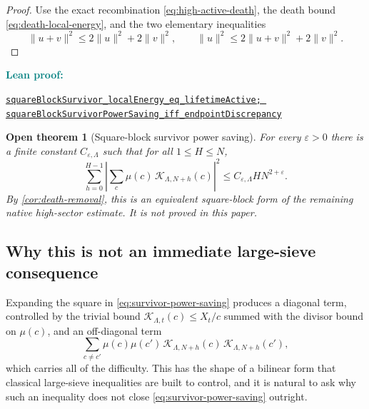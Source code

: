 \documentclass[11pt]{article}
\newtheorem{conjecture}[theorem]{Open theorem}
\theoremstyle{definition}
\newcommand{\eps}{\varepsilon}
\newcommand{\1}{\mathbf{1}}
\newcommand{\leanxref}[3]{%
  \par\smallskip
  {\small\noindent\textcolor{teal}{\textbf{#1:}}\par
  \noindent\href{#3}{\nolinkurl{#2}}\par}
  \smallskip
}
\begin{document}
\begin{proof}
Use the exact recombination \cref{eq:high-active-death}, the death bound \cref{eq:death-local-energy}, and the two elementary inequalities
\[
 \|u+v\|^2\le2\|u\|^2+2\|v\|^2,
 \qquad
 \|u\|^2\le2\|u+v\|^2+2\|v\|^2.
\]
\end{proof}
\leanxref{Lean proof}{squareBlockSurvivor_localEnergy_eq_lifetimeActive; squareBlockSurvivorPowerSaving_iff_endpointDiscrepancy}{https://github.com/OVVO-Financial/square-block-mobius/blob/main/lean/RHLean/Analysis/SquareBlockSurvivorBridge.lean}

\begin{conjecture}[Square-block survivor power saving]
\label{conj:survivor-power-saving}
For every $\eps>0$ there is a finite constant $C_{\eps,\Lambda}$ such that for all $1\le H\le N$,
\begin{equation}
 \boxed{
 \sum_{h=0}^{H-1}
 \left|
 \sum_{c}\mu(c)\,\mathcal K_{\Lambda,N+h}(c)
 \right|^2
 \le C_{\eps,\Lambda}H N^{2+\eps}.
 }
 \label{eq:survivor-power-saving}
\end{equation}
By \cref{cor:death-removal}, this is an equivalent square-block form of the remaining native high-sector estimate.  It is not proved in this paper.
\end{conjecture}

\subsection{Why this is not an immediate large-sieve consequence}
\label{subsec:why-not-large-sieve}

Expanding the square in \cref{eq:survivor-power-saving} produces a diagonal term, controlled by the trivial bound $\mathcal K_{\Lambda,t}(c)\le X_t/c$ summed with the divisor bound on $\mu(c)$, and an off-diagonal term
\begin{equation}
 \sum_{c\ne c'}\mu(c)\mu(c')\,\mathcal K_{\Lambda,N+h}(c)\,\mathcal K_{\Lambda,N+h}(c'),
 \label{eq:survivor-off-diagonal}
\end{equation}
which carries all of the difficulty.  This has the shape of a bilinear form that classical large-sieve inequalities \cite{montgomery-vaughan} are built to control, and it is natural to ask why such an inequality does not close \cref{eq:survivor-power-saving} outright.
\end{document}
